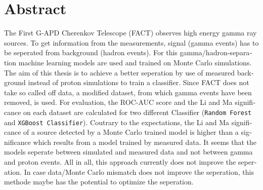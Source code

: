 \section*{Abstract}
\begin{english}
The First G-APD Cherenkov Telescope (FACT) observes high energy gamma ray sources. 
To get information from the measurements, signal (gamma events) has to be seperated from background (hadron events).
For this gamma/hadron-separation machine learning models are used and trained on Monte Carlo simulations.
The aim of this thesis is to achieve a better seperation by use of measured background instead of proton simulations to train a classifier.
Since FACT does not take so called off data, a modified dataset, from which gamma events have been removed, is used.
For evaluation, the ROC-AUC score and the Li and Ma significance on each dataset are calculated for two different Classifier (\texttt{Random Forest} and \texttt{XGBoost Classifier}).
Coutrary to the expectations, the Li and Ma significance of a source detected by a Monte Carlo trained model is higher than a significance which results from a model trained by measured data.
It seems that the models seperate between simulated and measured data and not between gamma and proton events.
All in all, this approach currently does not improve the seperation.
In case data/Monte Carlo mismatch does not improve the seperation, this methode maybe has the potential to optimize the seperation.
\end{english}
